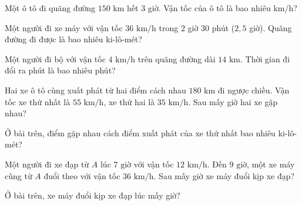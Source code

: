 
\begin{ex}
  Một ô tô đi quãng đường $150\text{ km}$ hết $3$ giờ. Vận tốc của ô tô là bao nhiêu km/h?
\end{ex}

\begin{ex}
  Một người đi xe máy với vận tốc $36\text{ km/h}$ trong $2$ giờ $30$ phút ($2{,}5$ giờ). Quãng đường đi được là bao nhiêu ki-lô-mét?
\end{ex}

\begin{ex}
  Một người đi bộ với vận tốc $4\text{ km/h}$ trên quãng đường dài $14\text{ km}$. Thời gian đi đổi ra phút là bao nhiêu phút?
\end{ex}

\begin{ex}
  Hai xe ô tô cùng xuất phát từ hai điểm cách nhau $180\text{ km}$ đi ngược chiều. Vận tốc xe thứ nhất là $55\text{ km/h}$, xe thứ hai là $35\text{ km/h}$. Sau mấy giờ hai xe gặp nhau?
\end{ex}

\begin{ex}
  Ở bài trên, điểm gặp nhau cách điểm xuất phát của xe thứ nhất bao nhiêu ki-lô-mét?
\end{ex}

\begin{ex}
  Một người đi xe đạp từ $A$ lúc $7\text{ giờ}$ với vận tốc $12\text{ km/h}$. Đến $9\text{ giờ}$, một xe máy cũng từ $A$ đuổi theo với vận tốc $36\text{ km/h}$. Sau mấy giờ xe máy đuổi kịp xe đạp?
\end{ex}

\begin{ex}
  Ở bài trên, xe máy đuổi kịp xe đạp lúc mấy giờ?
\end{ex}

